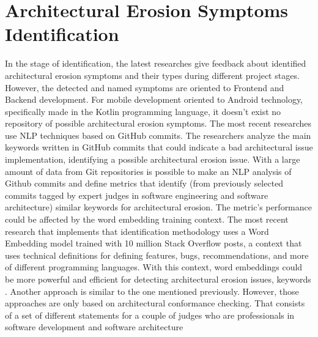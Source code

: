 \section{Architectural Erosion Symptoms Identification}
In the stage of identification, the latest researches give feedback about identified architectural erosion symptoms and their types during different project stages. However, the detected and named symptoms are oriented to Frontend and Backend development. For mobile development oriented to Android technology, specifically made in the Kotlin programming language, it doesn't exist no repository of possible architectural erosion symptoms. The most recent researches use NLP techniques based on GitHub commits. The researchers analyze the main keywords written in GitHub commits that could indicate a bad architectural issue implementation, identifying a possible architectural erosion issue.
With a large amount of data from Git repositories is possible to make an NLP analysis of Github commits and define metrics that identify (from previously selected commits tagged by expert judges in software engineering and software architecture) similar keywords for architectural erosion. The metric's performance could be affected by the word embedding training context. The most recent research that implements that identification methodology uses a Word Embedding model trained with 10 million Stack Overflow posts, a context that uses technical definitions for defining features, bugs, recommendations, and more of different programming languages. With this context, word embeddings could be more powerful and efficient for detecting architectural erosion issues, keywords \citet{warnings-architectural-erosion,so-word-embedding}.
Another approach is similar to the one mentioned previously. However, those approaches are only based on architectural conformance checking. That consists of a set of different statements for a couple of judges who are professionals in software development and software architecture


